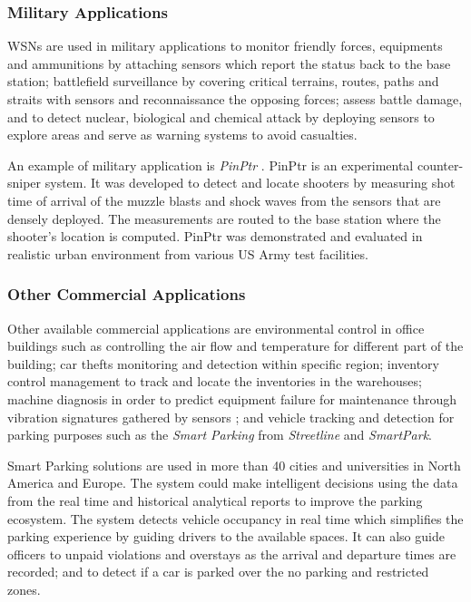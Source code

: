 \subsubsection{Military Applications}
WSNs are used in military applications to monitor friendly forces, equipments and ammunitions by attaching sensors which report the status back to the base station; battlefield surveillance by covering critical terrains, routes, paths and straits with sensors and reconnaissance the opposing forces; assess battle damage, and to detect nuclear, biological and chemical attack by deploying sensors to explore areas and serve as warning systems to avoid casualties.

An example of military application is \textit{PinPtr} \cite{Simonpinptr}. PinPtr is an experimental counter-sniper system. It was developed to detect and locate shooters by measuring shot time of arrival of the muzzle blasts and shock waves from the sensors that are densely deployed. The measurements are routed to the base station where the shooter's location is computed. PinPtr was demonstrated and evaluated in realistic urban environment from various US Army test facilities.

\subsubsection{Other Commercial Applications}
Other available commercial applications are environmental control in office buildings such as controlling the air flow and temperature for different part of the building; car thefts monitoring and detection within specific region; inventory control management to track and locate the inventories in the warehouses; machine diagnosis in order to predict equipment failure for maintenance through vibration signatures gathered by sensors \cite{industrialsensor}; and vehicle tracking and detection for parking purposes such as the \textit{Smart Parking} from \textit{Streetline} and \textit{SmartPark}. 

Smart Parking solutions are used in more than 40 cities and universities in North America and Europe. The system could make intelligent decisions using the data from the real time and historical analytical reports to improve the parking ecosystem. The system detects vehicle occupancy in real time which simplifies the parking experience by guiding drivers to the available spaces. It can also guide officers to unpaid violations and overstays as the arrival and departure times are recorded; and to detect if a car is parked over the no parking and restricted zones. 

